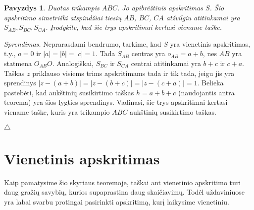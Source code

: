 \documentclass[11pt,a4paper,twoside]{book}
\newenvironment{sprendimas}{\noindent \textit{Sprendimas.}}{\hfill $\triangle$}
\newcounter{foo}[subsection]
\newtheorem{pavnr}[foo]{Pavyzdys}
\theoremstyle{definition} \newtheorem*{api}{Apibrėžimas}
\theoremstyle{remark} \newtheorem*{pastaba}{Pastaba}
\begin{document}
\begin{pavnr}
Duotas trikampis $ABC$. Jo apibrėžtinis apskritimas $S$. Šio apskritimo simetriški atspindžiai tiesių $AB$, $BC$, $CA$ atžvilgiu atitinkamai yra $S_{AB}, S_{BC}, S_{CA}$. Įrodykite, kad šie trys apskritimai kertasi viename taške.
\end{pavnr}
\begin{sprendimas}
Neprarasdami bendrumo, tarkime, kad $S$ yra vienetinis apskritimas, t.y., $o=0$ ir $|a|=|b|=|c|=1$. Tada $S_{AB}$ centras yra $o_{AB}=a+b$, nes $AB$ yra statmena $O_{AB}O$. Analogiškai, $S_{BC}$ ir $S_{CA}$ centrai atitinkamai yra $b+c$ ir $c+a$. Taškas $z$ priklauso visiems trims apskritimams tada ir tik tada, jeigu jis yra sprendinys $|z-(a+b)|=|z-(b+c)|=|z-(c+a)|=1$. Belieka pastebėti, kad aukštinių susikirtimo taškas $h=a+b+c$ (naudojantis antra teorema) yra šios lygties sprendinys. Vadinasi, šie trys apskritimai kertasi viename taške, kuris yra trikampio $ABC$ aukštinių susikirtimo taškas.

\end{sprendimas}





















\chapter{Vienetinis apskritimas}

Kaip pamatysime šio skyriaus teoremoje, taškai ant vienetinio apskritimo turi daug gražių savybių, kurios supaprastina daug skaičiavimų. Todėl uždaviniuose yra labai svarbu protingai pasirinkti apskritimą, kurį laikysime vienetiniu.
\end{document}
